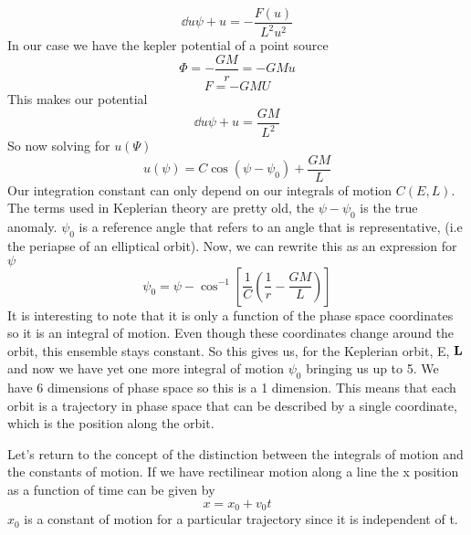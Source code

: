 \begin{equation}
\dd{u}{\psi} + u = -\frac{F(u)}{L^2 u^2}
\end{equation}
In our case we have the kepler potential of a point source
\begin{equation}
\Phi = -\frac{GM}{r} = -GMu
\end{equation}
\begin{equation}
F = - GMU
\end{equation}
This makes our potential
\begin{equation}
\dd{u}{\psi} + u = \frac{GM}{L^2}
\end{equation}
So now solving for $u(\Psi)$
\begin{equation}
u(\psi) = C \cos(\psi - \psi_0) + \frac{GM}{L}
\end{equation}
Our integration constant can only depend on our integrals of motion $C(E,L)$. The terms used in Keplerian theory are pretty old, the $\psi-\psi_0$ is the true anomaly. $\psi_0$ is a reference angle that refers to an angle that is representative, (i.e the periapse of an elliptical orbit). Now, we can rewrite this as an expression for $\psi$ 
\begin{equation}
\psi_0 = \psi - \cos^{-1} [ \frac{1}{C} (\frac{1}{r} - \frac{GM}{L})]
\end{equation}
It is interesting to note that it is only a function of the phase space coordinates so it is an integral of motion. Even though these coordinates change around the orbit, this ensemble stays constant. So this gives us, for the Keplerian orbit, E, $\mathbf{L}$ and now we have yet one more integral of motion $\psi_0$ bringing us up to 5. We have 6 dimensions of phase space so this is a 1 dimension. This means that each orbit is a trajectory in phase space that can be described by a single coordinate, which is the position along the orbit. 

Let's return to the concept of the distinction between the integrals of motion and the constants of motion. If we have rectilinear motion along a line the x position as a function of time can be given by
\begin{equation}
x = x_0 + v_0 t
\end{equation}
$x_0$ is a constant of motion for a particular trajectory since it is independent of t.

